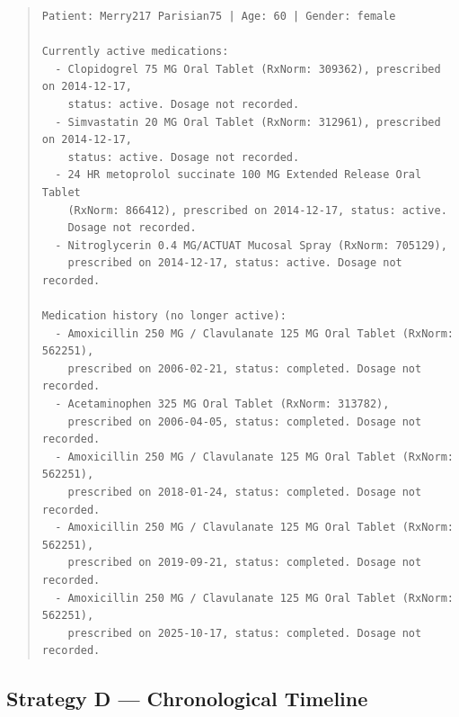 \begin{quote}
\scriptsize
\begin{verbatim}
Patient: Merry217 Parisian75 | Age: 60 | Gender: female

Currently active medications:
  - Clopidogrel 75 MG Oral Tablet (RxNorm: 309362), prescribed on 2014-12-17,
    status: active. Dosage not recorded.
  - Simvastatin 20 MG Oral Tablet (RxNorm: 312961), prescribed on 2014-12-17,
    status: active. Dosage not recorded.
  - 24 HR metoprolol succinate 100 MG Extended Release Oral Tablet
    (RxNorm: 866412), prescribed on 2014-12-17, status: active.
    Dosage not recorded.
  - Nitroglycerin 0.4 MG/ACTUAT Mucosal Spray (RxNorm: 705129),
    prescribed on 2014-12-17, status: active. Dosage not recorded.

Medication history (no longer active):
  - Amoxicillin 250 MG / Clavulanate 125 MG Oral Tablet (RxNorm: 562251),
    prescribed on 2006-02-21, status: completed. Dosage not recorded.
  - Acetaminophen 325 MG Oral Tablet (RxNorm: 313782),
    prescribed on 2006-04-05, status: completed. Dosage not recorded.
  - Amoxicillin 250 MG / Clavulanate 125 MG Oral Tablet (RxNorm: 562251),
    prescribed on 2018-01-24, status: completed. Dosage not recorded.
  - Amoxicillin 250 MG / Clavulanate 125 MG Oral Tablet (RxNorm: 562251),
    prescribed on 2019-09-21, status: completed. Dosage not recorded.
  - Amoxicillin 250 MG / Clavulanate 125 MG Oral Tablet (RxNorm: 562251),
    prescribed on 2025-10-17, status: completed. Dosage not recorded.
\end{verbatim}
\end{quote}

\subsection{Strategy D --- Chronological Timeline}
\label{app:strategy_d}

